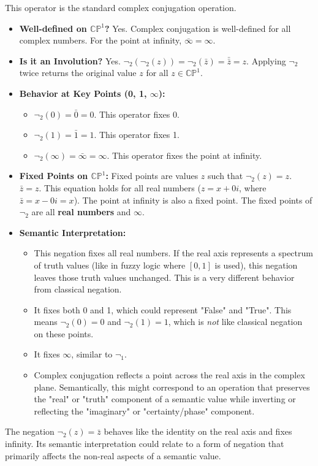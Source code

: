 \documentclass{article}
\begin{document}
	This operator is the standard complex conjugation operation.
	
	\begin{itemize}
		\item \textbf{Well-defined on $\mathbb{CP}^1$?} Yes. Complex conjugation is well-defined for all complex numbers. For the point at infinity, $\bar{\infty} = \infty$.
		
		\item \textbf{Is it an Involution?} Yes.
		$\neg_2(\neg_2(z)) = \neg_2(\bar{z}) = \bar{\bar{z}} = z$.
		Applying $\neg_2$ twice returns the original value $z$ for all $z \in \mathbb{CP}^1$.
		
		\item \textbf{Behavior at Key Points (0, 1, $\infty$):}
		\begin{itemize}
			\item $\neg_2(0) = \bar{0} = 0$. This operator fixes 0.
			\item $\neg_2(1) = \bar{1} = 1$. This operator fixes 1.
			\item $\neg_2(\infty) = \bar{\infty} = \infty$. This operator fixes the point at infinity.
		\end{itemize}
		
		\item \textbf{Fixed Points on $\mathbb{CP}^1$:} Fixed points are values $z$ such that $\neg_2(z) = z$.
		$\bar{z} = z$.
		This equation holds for all real numbers ($z = x + 0i$, where $\bar{z} = x - 0i = x$).
		The point at infinity is also a fixed point.
		The fixed points of $\neg_2$ are all \textbf{real numbers} and $\infty$.
		
		\item \textbf{Semantic Interpretation:}
		\begin{itemize}
			\item This negation fixes all real numbers. If the real axis represents a spectrum of truth values (like in fuzzy logic where $[0, 1]$ is used), this negation leaves those truth values unchanged. This is a very different behavior from classical negation.
			\item It fixes both 0 and 1, which could represent "False" and "True". This means $\neg_2(0) = 0$ and $\neg_2(1) = 1$, which is \textit{not} like classical negation on these points.
			\item It fixes $\infty$, similar to $\neg_1$.
			\item Complex conjugation reflects a point across the real axis in the complex plane. Semantically, this might correspond to an operation that preserves the "real" or "truth" component of a semantic value while inverting or reflecting the "imaginary" or "certainty/phase" component.
		\end{itemize}
	\end{itemize}
	The negation $\neg_2(z) = \bar{z}$ behaves like the identity on the real axis and fixes infinity. Its semantic interpretation could relate to a form of negation that primarily affects the non-real aspects of a semantic value.
	
\end{document}

